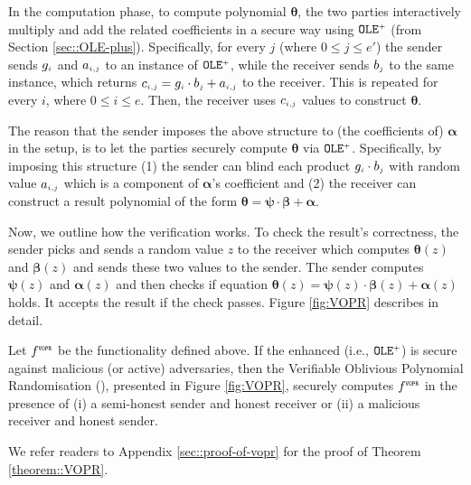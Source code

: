 In the computation phase,  to compute polynomial $\bm\theta$, the two parties interactively multiply and add the related coefficients in a secure way using $\mathtt{OLE}^{\scriptscriptstyle +}$ (from Section \ref{sec::OLE-plus}). Specifically,
%
%
for every $j$  (where $0\leq j\leq e'$) the sender sends $g_{\scriptscriptstyle i}$ and $a_{\scriptscriptstyle i,j}$ to an instance of  $\mathtt{OLE}^{\scriptscriptstyle +}$, while the receiver sends $b_{\scriptscriptstyle j}$ to the same instance,  which returns $c_{\scriptscriptstyle i,j}=g_{\scriptscriptstyle i}\cdot b_{\scriptscriptstyle j}+ a_{\scriptscriptstyle i,j}$ to the receiver. This is repeated for every $i$, where $0 \leq i \leq e$. Then, the receiver uses $c_{\scriptscriptstyle i,j}$ values to construct $\bm\theta$.  


The reason that the sender imposes the above structure to (the coefficients of)  $\bm\alpha$ in the setup, is to let the parties securely compute $\bm\theta$ via  $\mathtt{OLE}^{\scriptscriptstyle +}$. Specifically, by imposing this structure (1) the sender  can blind each product $g_{\scriptscriptstyle i}\cdot b_{\scriptscriptstyle j}$  with  random value $a_{\scriptscriptstyle i,j}$ which is a component of $\bm\alpha$'s coefficient and (2) the receiver can construct a result polynomial of the form $\bm\theta=\bm\psi\cdot \bm\beta+\bm\alpha$. 


Now, we outline how the verification works. To check the result's correctness, the sender picks and sends a random value $z$ to the receiver which computes  $\bm\theta(z)$ and $\bm\beta(z)$ and sends these two values  to the sender. The sender computes  $\bm\psi(z)$ and $\bm\alpha(z)$ and then checks if equation  $\bm\theta({ z})=\bm\psi({ z})\cdot \bm\beta({ z})+\bm\alpha({ z})$ holds. It accepts the result if the check passes.   Figure \ref{fig:VOPR} describes \vopr in detail.

\vs
\vs

\vs
\vs

\begin{theorem}\label{theorem::VOPR}
%
Let $f^{\scriptscriptstyle \mathtt{VOPR}}$ be the functionality defined above. If the enhanced \ole (i.e., $\mathtt{OLE}^{\scriptscriptstyle +}$) is secure against malicious (or active) adversaries, then the  Verifiable Oblivious Polynomial Randomisation (\vopr), presented in Figure \ref{fig:VOPR}, securely computes $f^{\scriptscriptstyle \mathtt{VOPR}}$ in the presence of (i) a semi-honest sender and honest receiver or (ii) a malicious receiver and honest sender. 
%
\end{theorem}

We refer readers to Appendix \ref{sec::proof-of-vopr} for the proof of Theorem \ref{theorem::VOPR}.




%

